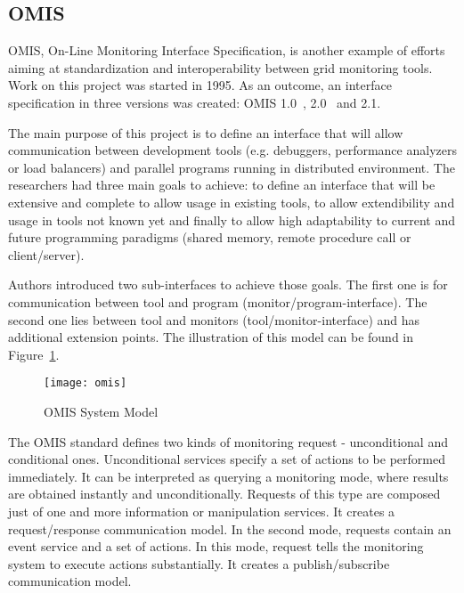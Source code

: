 
\subsection{OMIS}

\label{ssec:omis}

OMIS, On-Line Monitoring Interface Specification, is another example of efforts aiming at standardization and interoperability between grid monitoring tools. Work on this project was started in 1995. As an outcome, an interface specification in three versions was created: OMIS 1.0~\cite{OMIS1}, 2.0~\cite{OMIS2} and 2.1.

The main purpose of this project is to define an interface that will allow communication between development tools (e.g. debuggers, performance analyzers or load balancers) and parallel programs running in distributed environment. The researchers had three main goals to achieve: to define an interface that will be extensive and complete to allow usage in existing tools, to allow extendibility and usage in tools not known yet and finally to allow high adaptability to current and future programming paradigms (shared memory, remote procedure call or client/server).

Authors introduced two sub-interfaces to achieve those goals. The first one is for communication between tool and program (monitor/program-interface). The second one lies between tool and monitors (tool/monitor-interface) and has additional extension points. The illustration of this model can be found in Figure~\ref{fig:omis}.

\begin{figure}[ht]

\centering

\texttt{[image: omis]} \caption{OMIS System Model} \label{fig:omis}

\end{figure}

The OMIS standard defines two kinds of monitoring request - unconditional and conditional ones. Unconditional services specify a set of actions to be performed immediately. It can be interpreted as querying a monitoring mode, where results are obtained instantly and unconditionally. Requests of this type are composed just of one and more information or manipulation services. It creates a request/response communication model. In the second mode, requests contain an event service and a set of actions. In this mode, request tells the monitoring system to execute actions substantially. It creates a publish/subscribe communication model.

